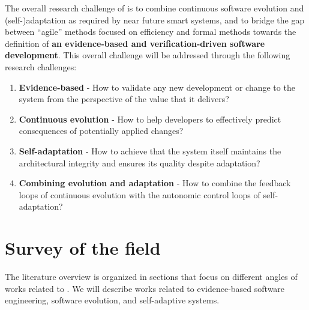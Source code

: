 \documentclass[12pt]{article}
\begin{document}
The overall research challenge of \name{} is to combine continuous software evolution and (self-)adaptation as required by near future smart systems, and to
bridge the gap between ``agile'' methods focused on efficiency and formal methods towards the definition of {\bf an evidence-based and verification-driven software development}. This overall challenge will be addressed through the following research challenges:
\begin{enumerate}
\item {\bf Evidence-based} - How to validate any new development or change to the system from the perspective of the value that it delivers? \vspace{-.2cm}
\item {\bf Continuous evolution} - How to help developers to effectively predict consequences of potentially applied changes? \vspace{-.2cm}
\item {\bf Self-adaptation} - How to achieve that the system itself maintains the architectural integrity and ensures its quality despite adaptation? \vspace{-.2cm}
\item {\bf Combining evolution and adaptation} - How to combine the feedback loops of continuous evolution with the autonomic control loops of self-adaptation?
\end{enumerate}

%




\vspace{-.5cm}

\section{Survey of the field}\label{sec:sota}
\vspace{-.2cm}

The literature overview is organized in sections that focus on different angles of works related to \name{}. We will describe works related to evidence-based software engineering, %
 software evolution, and self-adaptive systems. %
\end{document}
